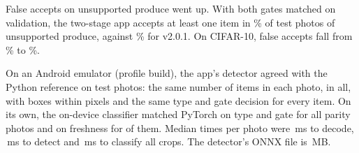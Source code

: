 False accepts on unsupported produce went up. With both gates matched on
validation, the two-stage app accepts at least one item in \ScanOodDet\% of
\ScanOodN{} test photos of unsupported produce, against \ScanOodVone\% for
v2.0.1. On CIFAR-10, false accepts fall from \ScanCifarVone\% to
\ScanCifarDet\%.

On an Android emulator (profile build), the app's detector agreed with the
Python reference on \DevPhotos{} test photos: the same number of items in each
photo, \DevItems{} in all, with boxes within \DevBoxPx{} pixels and the same
type and gate decision for every item. On its own, the on-device classifier
matched PyTorch on type and gate for all \DevClfPhotos{} parity photos and on
freshness for \DevClfFresh{} of them. Median times
per photo were \DevDecodeMs{}\,ms to decode,
\DevDetectMs{}\,ms to detect and \DevCropsMs{}\,ms to classify all crops. The
detector's ONNX file is \DetOnnxMb{}\,MB.
